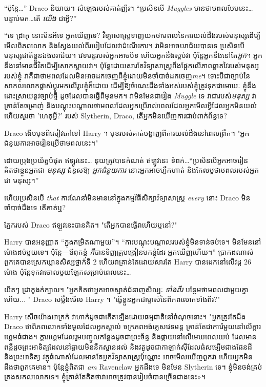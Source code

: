“ប៉ុន្តែ…” Draco និយាយ។ សំឡេងរបស់គាត់ញ័រ។ “ប្រសិនបើ \emph{Muggles} មានថាមពលបែបនេះ…បន្ទាប់មក…តើ \emph{យើង} ជាអ្វី?”

“ទេ ដ្រាកូ នោះមិនអីទេ អ្នកឃើញទេ? វិទ្យាសាស្ត្រទាញយកថាមពលនៃការយល់ដឹងរបស់មនុស្សដើម្បីមើលពិភពលោក និងស្វែងយល់ពីរបៀបដែលវាដំណើរការ។ វាមិនអាចបរាជ័យបានទេ ប្រសិនបើមនុស្សជាតិខ្លួនឯងបរាជ័យ។ វេទមន្តរបស់អ្នកអាចបិទ ហើយអ្នកនឹងស្អប់វា ប៉ុន្តែអ្នកនឹងនៅតែ\emph{អ្នក}។ អ្នកនឹងនៅមានជីវិតដើម្បីសោកស្តាយវា។ ប៉ុន្តែដោយសារតែវិទ្យាសាស្រ្តពឹងផ្អែកលើភាពឆ្លាតវៃរបស់មនុស្សរបស់ខ្ញុំ វាគឺជាថាមពលដែលមិនអាចដកចេញពីខ្ញុំដោយមិនចាំបាច់ដកចេញ\emph{me}។ ទោះបីជាច្បាប់នៃសាកលលោកផ្លាស់ប្តូរមកលើរូបខ្ញុំក៏ដោយ ដើម្បីឱ្យចំណេះដឹងទាំងអស់របស់ខ្ញុំត្រូវទុកជាមោឃៈ ខ្ញុំនឹងដោះស្រាយនូវច្បាប់ថ្មី ដូចដែលបានធ្វើពីមុនមក។ វាមិនមែនជារឿង \emph{Muggle} ទេ វាជារបស់\emph{មនុស្ស} វាគ្រាន់តែចម្រាញ់ និងបណ្តុះបណ្តាលថាមពលដែលអ្នកប្រើរាល់ពេលដែលអ្នកមើលអ្វីដែលអ្នកមិនយល់ ហើយសួរថា 'ហេតុអ្វី?' របស់ Slytherin, Draco, តើអ្នកមិនឃើញការជាប់ពាក់ព័ន្ធទេ?

Draco ងើបមុខពីសៀវភៅទៅ Harry ។ មុខរបស់គាត់បង្ហាញពីការយល់ដឹងនៅពេលព្រឹក។ "អ្នកជំនួយការអាចរៀនប្រើថាមពលនេះ។"

ដោយប្រុងប្រយ័ត្នបំផុត ឥឡូវនេះ… នុយត្រូវបានកំណត់ ឥឡូវនេះ ទំពក់…“ប្រសិនបើអ្នកអាចរៀនគិតថាខ្លួនអ្នកជា \emph{មនុស្ស} ជំនួសឱ្យ \emph{អ្នកជំនួយការ} នោះអ្នកអាចហ្វឹកហាត់ និងកែលម្អថាមពលរបស់អ្នកជា មនុស្ស។”

ហើយប្រសិនបើ \emph{that} ការណែនាំមិនមាននៅក្នុងកម្មវិធីសិក្សាវិទ្យាសាស្ត្រ \emph{every} នោះ Draco មិនចាំបាច់ដឹងទេ តើគាត់ឬ?

ភ្នែករបស់ Draco ឥឡូវនេះបានគិត។ "តើអ្នកបានធ្វើវាហើយឬនៅ?"

Harry បានអនុញ្ញាត “ក្នុងកម្រិតណាមួយ”។ “ការបណ្តុះបណ្តាលរបស់ខ្ញុំមិនទាន់ចប់ទេ។ មិនមែននៅម៉ោងដប់មួយទេ។ ប៉ុន្តែ—ឪពុកខ្ញុំ \emph{ក៏}បានទិញគ្រូបង្រៀនមកខ្ញុំដែរ អ្នកឃើញហើយ។” ប្រាកដណាស់ ពួកគេបានស្រេកឃ្លានសិស្សថ្នាក់ទី 2 ហើយវាគ្រាន់តែដោយសារតែ Harry បានដេកនៅលើវដ្ត 26 ម៉ោង ប៉ុន្តែទុកវាចោលមួយឡែកសម្រាប់ពេលនេះ…

យឺតៗ ដ្រាកូងក់ក្បាល។ "អ្នកគិតថាអ្នកអាចស្ទាត់ជំនាញសិល្បៈ \emph{ទាំងពីរ} បន្ថែមថាមពលជាមួយគ្នា ហើយ... " Draco សម្លឹងមើល Harry ។ "ធ្វើខ្លួនអ្នកជាម្ចាស់នៃពិភពលោកទាំងពីរ?"

Harry សើចយ៉ាងអាក្រក់ វាហាក់ដូចជាកើតឡើងដោយធម្មជាតិនៅចំណុចនោះ។ "អ្នកត្រូវតែដឹង Draco ថាពិភពលោកទាំងមូលដែលអ្នកស្គាល់ ចក្រភពអង់គ្លេសវេទមន្ត គ្រាន់តែជាការ៉េមួយនៅលើក្តារហ្គេមធំជាង។ ក្តារហ្គេមដែលរួមបញ្ចូលកន្លែងដូចជាព្រះច័ន្ទ និងផ្កាយនៅលើមេឃពេលយប់ ដែលមានពន្លឺដូចព្រះអាទិត្យដែលនៅឆ្ងាយមិននឹកស្មានដល់ និងវត្ថុដូចជាកាឡាក់ស៊ីដែលធំសម្បើមជាងផែនដី និងព្រះអាទិត្យ វត្ថុធំណាស់ដែលមានតែអ្នកវិទ្យាសាស្ត្រប៉ុណ្ណោះ អាចមើលឃើញពួកវា ហើយអ្នកមិនដឹងថាពួកគេមាន។ ប៉ុន្តែខ្ញុំពិតជា \emph{am} Ravenclaw អ្នកដឹងទេ មិនមែន Slytherin ទេ។ ខ្ញុំមិនចង់គ្រប់គ្រងសកលលោកទេ។ ខ្ញុំ​គ្រាន់​តែ​គិត​ថា​វា​អាច​ត្រូវ​បាន​រៀបចំ​បាន​ច្រើន​ជាង​នេះ»។

